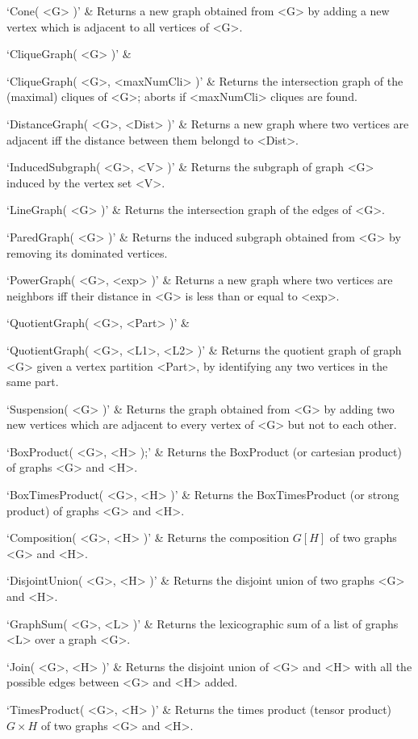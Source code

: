 `Cone( <G> )' & 
Returns a new graph obtained from <G> by adding a new vertex which is adjacent to all vertices of <G>.

`CliqueGraph( <G> )' &

`CliqueGraph( <G>, <maxNumCli> )' & 
Returns the intersection graph of the (maximal) cliques of <G>; aborts if <maxNumCli> cliques are found.

`DistanceGraph( <G>, <Dist> )' & 
Returns a new graph where two vertices are adjacent iff the distance between them belongd to <Dist>.

`InducedSubgraph( <G>, <V> )' & 
Returns the subgraph of graph <G> induced by the vertex set <V>.

`LineGraph( <G> )' & 
Returns the intersection graph of the edges of <G>.

`ParedGraph( <G> )' & 
Returns the induced subgraph obtained from   <G>  by  removing  its  dominated  vertices.

`PowerGraph( <G>, <exp> )' & 
Returns a new graph where two vertices are neighbors iff their distance in <G> is less than or equal to <exp>.

`QuotientGraph( <G>, <Part> )' & 

`QuotientGraph( <G>, <L1>, <L2> )' & 
Returns the quotient graph of graph <G> given a vertex partition <Part>, by identifying any two vertices in the same part.

`Suspension( <G> )' & 
Returns the graph obtained from  <G> by adding two new vertices which are adjacent to every
vertex of <G> but not to each other.
\enditems


\beginitems
`BoxProduct( <G>, <H> );' & 
Returns the BoxProduct (or cartesian product) of graphs <G> and <H>.

`BoxTimesProduct( <G>, <H> )' & 
Returns the BoxTimesProduct (or strong product) of graphs <G> and <H>.

`Composition( <G>, <H> )' & 
Returns the composition $G[H]$ of two graphs <G> and <H>.

`DisjointUnion( <G>, <H> )' & 
Returns the disjoint union of two graphs <G> and <H>.

`GraphSum( <G>, <L> )' & 
Returns the lexicographic sum of a list of graphs <L> over a graph <G>.

`Join( <G>, <H> )' & 
Returns the disjoint union of <G> and <H> with all the possible edges between <G> and <H> added.

`TimesProduct( <G>, <H> )' & 
Returns  the  times  product (tensor product) $G  \times  H$ of two graphs <G> and <H>.
\enditems

